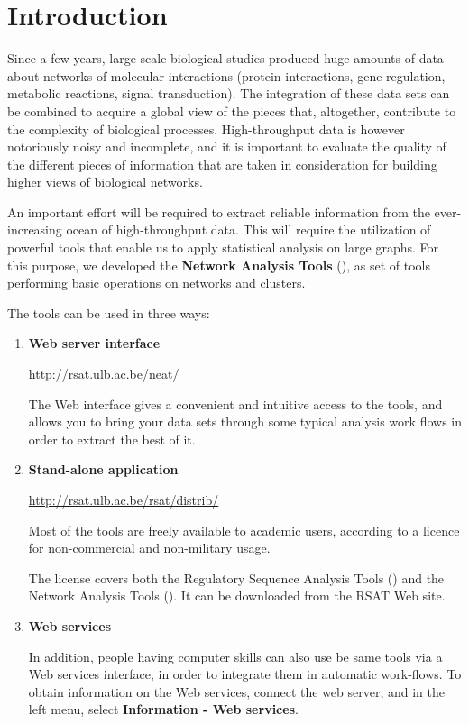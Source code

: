 \chapter{Introduction}

Since a few years, large scale biological studies produced huge
amounts of data about networks of molecular interactions (protein
interactions, gene regulation, metabolic reactions, signal
transduction). The integration of these data sets can be combined to
acquire a global view of the pieces that, altogether, contribute to
the complexity of biological processes. High-throughput data is
however notoriously noisy and incomplete, and it is important to
evaluate the quality of the different pieces of information that are
taken in consideration for building higher views of biological
networks.

An important effort will be required to extract reliable information
from the ever-increasing ocean of high-throughput data. This will
require the utilization of powerful tools that enable us to apply
statistical analysis on large graphs. For this purpose, we developed
the \textbf{Network Analysis Tools} (\neat), as set of tools performing
basic operations on networks and clusters. 

The tools can be used in three ways:

\begin{enumerate}

\item \textbf{Web server interface}

  \url{http://rsat.ulb.ac.be/neat/}
  
  The Web interface gives a convenient and intuitive access to the
  tools, and allows you to bring your data sets through some typical
  analysis work flows in order to extract the best of it.
  
\item \textbf{Stand-alone application}
  
  \url{http://rsat.ulb.ac.be/rsat/distrib/}
  
  Most of the tools are freely available to academic users, according
  to a licence for non-commercial and non-military usage.

  The license covers both the Regulatory Sequence Analysis Tools
  (\RSAT) and the Network Analysis Tools (\neat). It can be downloaded
  from the RSAT Web site.

\item \textbf{Web services}

  
  In addition, people having computer skills can also use be same
  tools via a Web services interface, in order to integrate them in
  automatic work-flows. To obtain information on the Web services,
  connect the \neat web server, and in the left menu, select
  \textbf{Information - Web services}.

\end{enumerate}


